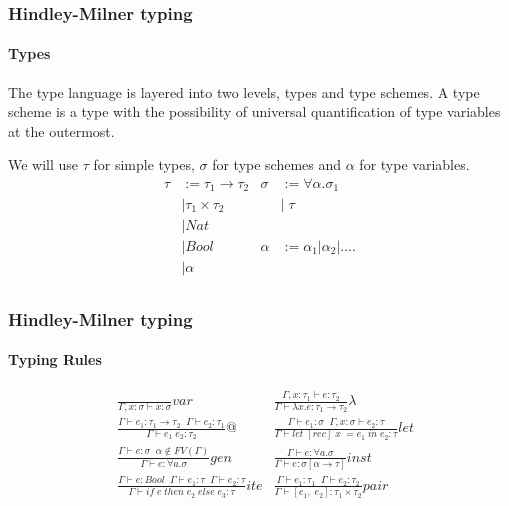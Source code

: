 \documentclass[xcolor=table]{beamer}
\begin{document}
 
\begin{frame}
\frametitle{Hindley-Milner typing}
\framesubtitle{Types}
The type language is layered into two levels, types and type schemes. 
A type scheme is a type with the possibility of universal quantification of type variables at the outermost.

\begin{block}{We will use $\tau$ for simple types, $\sigma$ for type schemes and $\alpha$ for type variables.}
\begin{align*}
\tau & := \tau_1\rightarrow \tau_2  &  \sigma  & := \forall  \alpha. \sigma_1\\
        & | \tau_1 \times \tau_2          &                      & | \;\tau \\
        & | Nat                                    & \\
        & | Bool                                  & \alpha & := \alpha _1 | \alpha _2| .... \\
        & | \alpha                                       & \\
\end{align*}
\end{block} 
\end{frame}  
 
\begin{frame}
\frametitle{Hindley-Milner typing}
\framesubtitle{Typing Rules}

\begin{small}
\begin{align*}
& \frac{}{\Gamma , x: \sigma \vdash x:\sigma }var  
& \frac{\Gamma, x:\tau_1 \vdash e:\tau_2}{\Gamma \vdash \lambda x. e:\tau_1 \rightarrow \tau_2}\lambda \\[0.3cm]
& \frac{\Gamma \vdash e_1:\tau_1\rightarrow\tau_2 \;\; \Gamma \vdash e_2:\tau_1}{\Gamma \vdash e_1 \; e_2:\tau_2 }@ 
& \frac{\Gamma \vdash e_1:\sigma \;\;\Gamma, x:\sigma \vdash e_2:\tau}{\Gamma \vdash let \; [rec] \; x \; = e_1 \; in \; e_2:\tau }let \\[0.3cm]
& \frac{\Gamma \vdash e: \sigma \;\; \alpha \not \in FV(\Gamma)}{\Gamma \vdash e: \forall a. \sigma }gen 
& \frac{\Gamma \vdash e: \forall a. \sigma }{\Gamma \vdash e:\sigma [\alpha \rightarrow \tau ] }inst \\[0.3cm]
& \frac{\Gamma \vdash e : Bool \;\; \Gamma \vdash e_1:\tau \;\; \Gamma \vdash e_2:\tau}{\Gamma \vdash if \; e \; then \; e_2 \; else \;e_3 : \tau}ite
& \frac{\Gamma \vdash e_1:\tau_1 \;\; \Gamma \vdash e_2:\tau_2}{\Gamma \vdash [e_1, \; e_2]:\tau_1\times \tau_2  }pair \\[0.3cm]
\end{align*}
\end{small}
\end{frame} 
\end{document}

